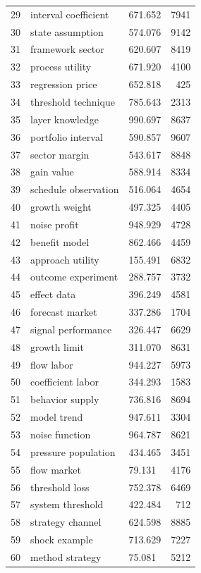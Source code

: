 \documentclass[11pt]{report}
\begin{document}
\begin{longtable}{rllr}
29 & interval coefficient & 671.652 & 7941 \\
30 & state assumption & 574.076 & 9142 \\
31 & framework sector & 620.607 & 8419 \\
32 & process utility & 671.920 & 4100 \\
33 & regression price & 652.818 & 425 \\
34 & threshold technique & 785.643 & 2313 \\
35 & layer knowledge & 990.697 & 8637 \\
36 & portfolio interval & 590.857 & 9607 \\
37 & sector margin & 543.617 & 8848 \\
38 & gain value & 588.914 & 8334 \\
39 & schedule observation & 516.064 & 4654 \\
40 & growth weight & 497.325 & 4405 \\
41 & noise profit & 948.929 & 4728 \\
42 & benefit model & 862.466 & 4459 \\
43 & approach utility & 155.491 & 6832 \\
44 & outcome experiment & 288.757 & 3732 \\
45 & effect data & 396.249 & 4581 \\
46 & forecast market & 337.286 & 1704 \\
47 & signal performance & 326.447 & 6629 \\
48 & growth limit & 311.070 & 8631 \\
49 & flow labor & 944.227 & 5973 \\
50 & coefficient labor & 344.293 & 1583 \\
51 & behavior supply & 736.816 & 8694 \\
52 & model trend & 947.611 & 3304 \\
53 & noise function & 964.787 & 8621 \\
54 & pressure population & 434.465 & 3451 \\
55 & flow market & 79.131 & 4176 \\
56 & threshold loss & 752.378 & 6469 \\
57 & system threshold & 422.484 & 712 \\
58 & strategy channel & 624.598 & 8885 \\
59 & shock example & 713.629 & 7227 \\
60 & method strategy & 75.081 & 5212 \\
\end{longtable}
\end{document}
